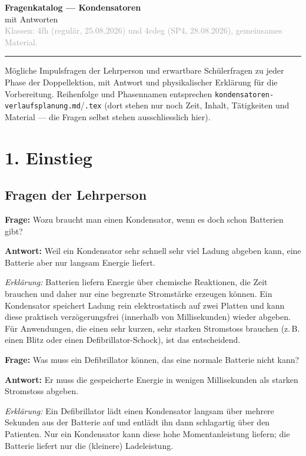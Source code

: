 \documentclass[11pt,a4paper]{article}
\newcommand{\Frage}[1]{\textbf{Frage:} #1\par}
\newcommand{\Antwort}[1]{\textbf{Antwort:} #1\par}
\newcommand{\Erklaerung}[1]{\textit{Erklärung:} #1}
\newcommand{\FrageBlock}[3]{\Frage{#1}\Antwort{#2}\Erklaerung{#3}\vspace{0.6em}}
\begin{document}
{\Large\bfseries\color{titleblue} Fragenkatalog --- Kondensatoren}\\[0.2em]
{\large\color{accentblue} mit Antworten}\\[0.4em]
\textcolor{darkgray}{Klassen: 4fh (regulär, 25.08.2026) und 4cdeg (SP4, 28.08.2026), gemeinsames Material.}

\vspace{0.3em}
{\noindent\color{accentblue}\rule{\linewidth}{0.8pt}}
\vspace{0.5em}

Mögliche Impulsfragen der Lehrperson und erwartbare Schülerfragen zu jeder
Phase der Doppellektion, mit Antwort und physikalischer Erklärung für die
Vorbereitung. Reihenfolge und Phasennamen entsprechen
\texttt{kondensatoren-\allowbreak verlaufsplanung.md}/\texttt{.tex} (dort
stehen nur noch Zeit, Inhalt, Tätigkeiten und Material --- die Fragen
selbst stehen ausschliesslich hier).

\section*{1. Einstieg}

\subsection*{Fragen der Lehrperson}

\FrageBlock{Wozu braucht man einen Kondensator, wenn es doch schon Batterien gibt?}
{Weil ein Kondensator sehr schnell sehr viel Ladung abgeben kann, eine Batterie aber nur langsam Energie liefert.}
{Batterien liefern Energie über chemische Reaktionen, die Zeit brauchen und daher nur eine begrenzte Stromstärke erzeugen können. Ein Kondensator speichert Ladung rein elektrostatisch auf zwei Platten und kann diese praktisch verzögerungsfrei (innerhalb von Millisekunden) wieder abgeben. Für Anwendungen, die einen sehr kurzen, sehr starken Stromstoss brauchen (z.\,B. einen Blitz oder einen Defibrillator-Schock), ist das entscheidend.}

\FrageBlock{Was muss ein Defibrillator können, das eine normale Batterie nicht kann?}
{Er muss die gespeicherte Energie in wenigen Millisekunden als starken Stromstoss abgeben.}
{Ein Defibrillator lädt einen Kondensator langsam über mehrere Sekunden aus der Batterie auf und entlädt ihn dann schlagartig über den Patienten. Nur ein Kondensator kann diese hohe Momentanleistung liefern; die Batterie liefert nur die (kleinere) Ladeleistung.}
\end{document}
